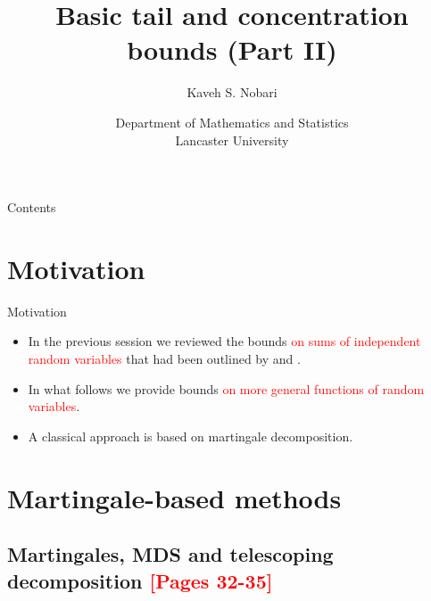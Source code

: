 \documentclass[10pt,handout,english]{beamer}
\title[]{Basic tail and concentration bounds (Part II)}
\author[Kaveh S. Nobari]{Kaveh S. Nobari}
\institute[]{Reading Sessions in High-Dimensional Statistics}
\date[27/10/2020]
{Department of Mathematics and Statistics\\ Lancaster University}
\newcommand{\1}{\mathbbm{1}}
\begin{document}
\begin{frame}
\titlepage
\end{frame}


\begin{frame}{Contents}
\tableofcontents
\end{frame}

\section{Motivation}
\begin{frame}[allowframebreaks]{Motivation}
\begin{itemize}
\setlength\itemsep{0.5em}
\item In the previous session we reviewed the bounds \textcolor{red}{on sums of independent random variables} that had been outlined by \citet{wainwright2019high} and \citet{vershynin2018high}. \justifying
\item In what follows we provide bounds \textcolor{red}{on more general functions of random variables}.\justifying 
\item A classical approach is based on martingale decomposition.\justifying
\end{itemize}
\end{frame}

\section{Martingale-based methods}
\subsection{Martingales, MDS and telescoping decomposition \textcolor{red}{[Pages 32-35]}}
\end{document}
